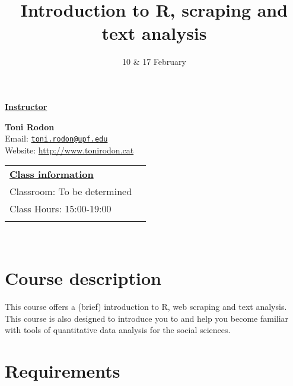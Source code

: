 \documentclass[11pt,]{article}
\title{Introduction to R, scraping and text analysis}
\date{10 \& 17 February}
\begin{document}
  

		\maketitle
		
	
		\thispagestyle{firststyle}

\textbf{\underline{Instructor}}

  \textbf{Toni Rodon}\\
  Email: \href{mailto:toni.rodon@upf.edu}{\nolinkurl{toni.rodon@upf.edu}}\\
  Website: \url{http://www.tonirodon.cat}\\
    
	
\noindent \begin{tabular*}{\textwidth}{ @{\extracolsep{\fill}} lr @{\extracolsep{\fill}}}
\textbf{\underline{Class information}}\\
  Classroom: To be determined\\
  Class Hours: 15:00-19:00\\
  \\
	\end{tabular*}\\


\vspace{2mm}


\hypertarget{course-description}{%
\section{Course description}\label{course-description}}

This course offers a (brief) introduction to R, web scraping and text
analysis. This course is also designed to introduce you to and help you
become familiar with tools of quantitative data analysis for the social
sciences.

\hypertarget{requirements}{%
\section{Requirements}\label{requirements}}
\end{document}
